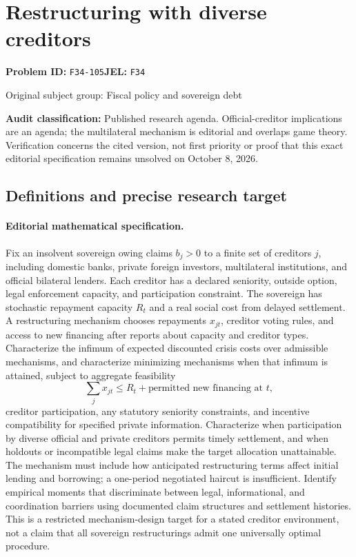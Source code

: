\documentclass[11pt,a4paper]{article}
\begin{document}
\section*{Restructuring with diverse creditors}
\textbf{Problem ID:} \texttt{F34-105}\quad \textbf{JEL:} \texttt{F34}\par
\label{problem:OP-0256}
{\sffamily\small\color{muted}Original subject group: Fiscal policy and sovereign debt\par}
\label{definitions:problem:30007537}
\textbf{Audit classification:} Published research agenda. Official-creditor implications are an agenda; the multilateral mechanism is editorial and overlaps game theory. Verification concerns the cited version, not first priority or proof that this exact editorial specification remains unsolved on October 8, 2026.
\subsection*{Definitions and precise research target}
\paragraph{Editorial mathematical specification.} Fix an insolvent sovereign owing claims \(b_j>0\) to a finite set of creditors \(j\), including domestic banks, private foreign investors, multilateral institutions, and official bilateral lenders. Each creditor has a declared seniority, outside option, legal enforcement capacity, and participation constraint. The sovereign has stochastic repayment capacity \(R_t\) and a real social cost from delayed settlement. A restructuring mechanism chooses repayments \(x_{jt}\), creditor voting rules, and access to new financing after reports about capacity and creditor types.
Characterize the infimum of expected discounted crisis costs over admissible mechanisms, and characterize minimizing mechanisms when that infimum is attained, subject to aggregate feasibility
\[
\sum_j x_{jt}\le R_t+\text{permitted new financing at }t,
\]
creditor participation, any statutory seniority constraints, and incentive compatibility for specified private information. Characterize when participation by diverse official and private creditors permits timely settlement, and when holdouts or incompatible legal claims make the target allocation unattainable. The mechanism must include how anticipated restructuring terms affect initial lending and borrowing; a one-period negotiated haircut is insufficient. Identify empirical moments that discriminate between legal, informational, and coordination barriers using documented claim structures and settlement histories. This is a restricted mechanism-design target for a stated creditor environment, not a claim that all sovereign restructurings admit one universally optimal procedure.
\end{document}
